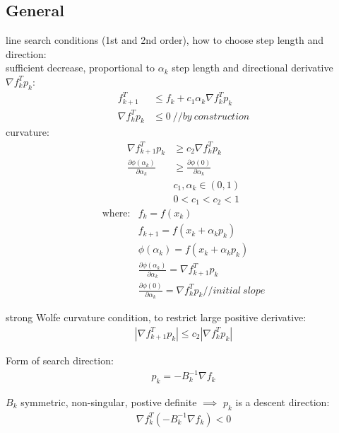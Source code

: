 \documentclass[8pt,letter]{article}
\begin{document}

\begin{multicols*}{2}

  \section{General}

  line search conditions (1st and 2nd order), how to choose step length and direction:\\
  
  sufficient decrease, proportional to $\alpha_k$ step length and directional derivative $\nabla f_k^T p_k$:
  \begin{align}
    f_{k+1}^T & \leq f_k + c_1 \alpha_k \nabla f_k^T p_k\\
    \nabla f_k^T p_k & \leq 0\ //by\ construction
  \end{align}
  curvature:
  \begin{align}
    \nabla f_{k+1}^T p_k & \geq c_2 \nabla f_k^T p_k\\
    \frac{\partial \phi(\alpha_k)}{\partial \alpha_k} & \geq \frac{\partial \phi(0)}{\partial \alpha_k}\\
              &c_1,\alpha_k \in (0,1)\\
    &0<c_1<c_2<1
  \end{align}
  \begin{align*}
  \text{where}:& f_{k} = f(x_k)\\
  & f_{k+1} = f(x_k+\alpha_k p_k)\\
  & \phi(\alpha_k) = f(x_k + \alpha_k p_k)\\
  & \frac{\partial \phi(\alpha_k)}{\partial \alpha_k} = \nabla f_{k+1}^T p_k\\
  & \frac{\partial \phi(0)}{\partial \alpha_k} = \nabla f_{k}^T p_k //initial\ slope
  \end{align*}

  strong Wolfe curvature condition, to restrict large positive derivative:
  \begin{align}
    | \nabla f_{k+1}^T p_k| \leq c_2 |\nabla f_k^T p_k|
  \end{align}
  
  Form of search direction:
  \begin{align}
    p_k = - B_k^{-1} \nabla f_k
  \end{align}
  
  $B_k$ symmetric, non-singular, postive definite $\implies$ $p_k$ is a descent direction:
  \begin{align}
    \nabla f_k^T(-B_k^{-1} \nabla f_k) < 0
  \end{align}


\end{multicols*}
\end{document}
